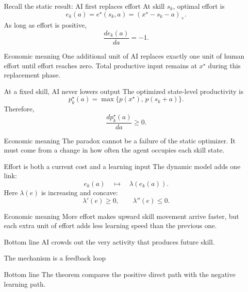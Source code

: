 \documentclass[aspectratio=169,11pt]{beamer}
\newcommand{\pos}[1]{\left(#1\right)_{+}}
\newcommand{\econmeaning}[1]{%
  \begin{block}{Economic meaning}
  #1
  \end{block}}
\newcommand{\bottomline}[1]{%
  \begin{alertblock}{Bottom line}
  #1
  \end{alertblock}}
\begin{document}
\begin{frame}{Recall the static result: AI first replaces effort}
At skill $s_k$, optimal effort is
\[
\boxed{e_k(a)=e^\star(s_k,a)=\pos{x^\star-s_k-a}.}
\]
As long as effort is positive,
\[
\frac{d e_k(a)}{da}=-1.
\]
\econmeaning{One additional unit of AI replaces exactly one unit of human effort until effort reaches zero. Total productive input remains at $x^\star$ during this replacement phase.}
\end{frame}

\begin{frame}{At a fixed skill, AI never lowers output}
The optimized state-level productivity is
\[
\boxed{p_k^\star(a)=\max\{p(x^\star),\,p(s_k+a)\}.}
\]
Therefore,
\[
\frac{d p_k^\star(a)}{da}\ge 0.
\]
\econmeaning{The paradox cannot be a failure of the static optimizer. It must come from a change in how often the agent occupies each skill state.}
\end{frame}

\begin{frame}{Effort is both a current cost and a learning input}
The dynamic model adds one link:
\[
e_k(a)\quad\longmapsto\quad \lambda(e_k(a)).
\]
Here $\lambda(e)$ is increasing and concave:
\[
\lambda'(e)\ge0,
\qquad
\lambda''(e)\le0.
\]
\econmeaning{More effort makes upward skill movement arrive faster, but each extra unit of effort adds less learning speed than the previous one.}
\bottomline{AI crowds out the very activity that produces future skill.}
\end{frame}

\begin{frame}{The mechanism is a feedback loop}
\centering
{}
\vspace{5mm}
\bottomline{The theorem compares the positive direct path with the negative learning path.}
\end{frame}
\end{document}

